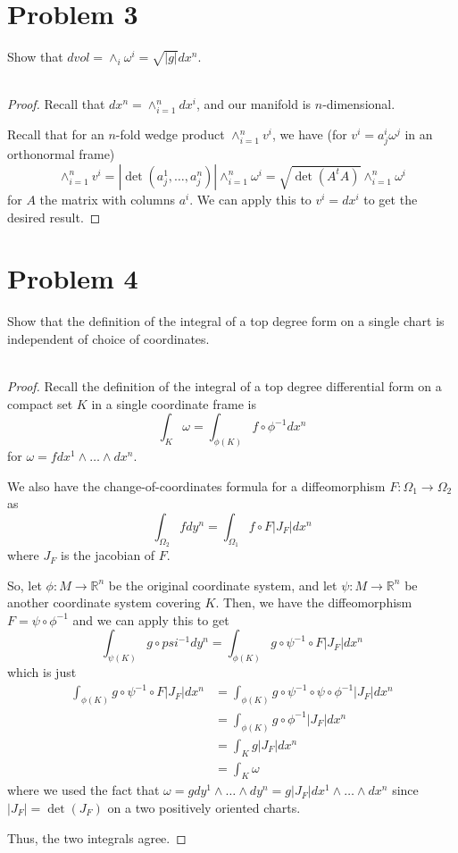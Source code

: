 \documentclass[fontsize=11pt]{scrartcl} %
\numberwithin{equation}{section} %
\numberwithin{figure}{section} %
\numberwithin{table}{section} %
\newcommand{\R}{\mathbb{R}}
\begin{document}
\section*{Problem 3}
Show that $dvol = \wedge_i\omega^i = \sqrt{|g|}dx^n$.
\\
\\
\begin{proof}
    Recall that $dx^n = \wedge_{i=1}^ndx^i$, and our manifold is
    $n$-dimensional.

    Recall that for an $n$-fold wedge product $\wedge_{i=1}^n v^i$, we have (for
    $v^i = a_j^i\omega^j$ in an orthonormal frame)
    \[
        \wedge_{i=1}^n v^i = |\det(a_j^1,\dots,a_j^n)|\wedge_{i=1}^n\omega^i
        =\sqrt{\det(A^tA)}\wedge_{i=1}^n\omega^i
    \]
    for $A$ the matrix with columns $a^i$. We can apply this to $v^i = dx^i$ to
    get the desired result.
\end{proof}

\section*{Problem 4}
Show that the definition of the integral of a top degree form on a single chart
is independent of choice of coordinates.
\\
\\
\begin{proof}
    Recall the definition of the integral of a top degree differential form on a
    compact set $K$ in a single coordinate frame is
    \[
        \int_K\omega = \int_{\phi(K)}f\circ\phi^{-1}dx^n
    \]
    for $\omega = fdx^1\wedge\dots\wedge dx^n$.

    We also have the change-of-coordinates formula for a diffeomorphism
    $F:\Omega_1\to\Omega_2$ as
    \[
        \int_{\Omega_2}fdy^n = \int_{\Omega_1}f\circ F|J_F|dx^n
    \]
    where $J_F$ is the jacobian of $F$.

    So, let $\phi:M\to\R^n$ be the original coordinate system, and let
    $\psi:M\to\R^n$ be another coordinate system covering $K$. Then, we have the
    diffeomorphism $F = \psi\circ\phi^{-1}$ and we can apply this to get
    \[
        \int_{\psi(K)}g\circ psi^{-1}dy^n = \int_{\phi(K)} g\circ\psi^{-1}\circ F|J_F|dx^n
    \]
    which is just
    \[
        \begin{aligned}
            \int_{\phi(K)} g\circ\psi^{-1}\circ F|J_F|dx^n &= \int_{\phi(K)}
            g\circ \psi^{-1}\circ 
            \psi\circ\phi^{-1}|J_F|dx^n\\
            &= \int_{\phi(K)} g\circ \phi^{-1} |J_F|dx^n\\
            &= \int_K g|J_F|dx^n\\
            &= \int_K\omega
        \end{aligned}
    \]
    where we used the fact that $\omega = g dy^1\wedge\dots\wedge dy^n =
    g|J_F|dx^1\wedge\dots\wedge dx^n$ since $|J_F|=\det(J_F)$ on a two
    positively oriented charts.

    Thus, the two integrals agree.
\end{proof}
\end{document}
